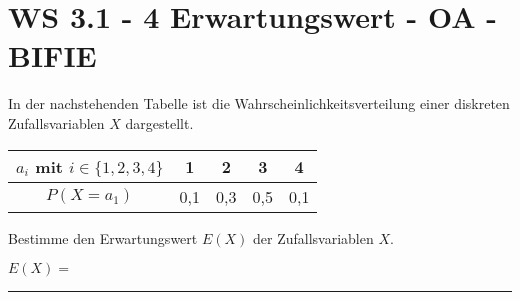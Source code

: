 \section{WS 3.1 - 4 Erwartungswert - OA - BIFIE}

\begin{beispiel}[WS 3.1]{1} %
In der nachstehenden Tabelle ist die Wahrscheinlichkeitsverteilung einer diskreten Zufallsvariablen
$X$ dargestellt.

\begin{center}
\begin{tabular}{|c|c|c|c|c|} \hline
$a_i$ mit $i \in \{1,2,3,4\}$ & 1&2&3&4 \\ \hline
$P(X=a_1)$ & 0,1&0,3&0,5&0,1 \\ \hline
\end{tabular}
\end{center}

Bestimme den Erwartungswert $E(X)$ der Zufallsvariablen $X$.\leer

$E(X)=$\rule{5cm}{0.3pt}


\end{beispiel} 